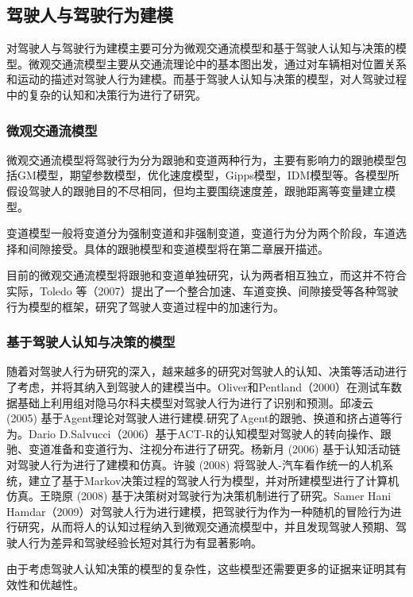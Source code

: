 \subsection{驾驶人与驾驶行为建模}
对驾驶人与驾驶行为建模主要可分为微观交通流模型和基于驾驶人认知与决策的模型。微观交通流模型主要从交通流理论中的基本图出发，通过对车辆相对位置关系和运动的描述对驾驶人行为建模。而基于驾驶人认知与决策的模型，对人驾驶过程中的复杂的认知和决策行为进行了研究。
\subsubsection{微观交通流模型}
微观交通流模型将驾驶行为分为跟驰和变道两种行为，主要有影响力的跟驰模型包括GM模型，期望参数模型，优化速度模型，Gipps模型，IDM模型等。各模型所假设驾驶人的跟驰目的不尽相同，但均主要围绕速度差，跟驰距离等变量建立模型。

变道模型一般将变道分为强制变道和非强制变道，变道行为分为两个阶段，车道选择和间隙接受。具体的跟驰模型和变道模型将在第二章展开描述。

目前的微观交通流模型将跟驰和变道单独研究，认为两者相互独立，而这并不符合实际，Toledo 等（2007）提出了一个整合加速、车道变换、间隙接受等各种驾驶行为模型的框架，研究了驾驶人变道过程中的加速行为\cite{Toledo2007}。


\subsubsection{基于驾驶人认知与决策的模型}
随着对驾驶人行为研究的深入，越来越多的研究对驾驶人的认知、决策等活动进行了考虑，并将其纳入到驾驶人的建模当中。Oliver和Pentland（2000）在测试车数据基础上利用组对隐马尔科夫模型对驾驶人行为进行了识别和预测\cite{Oliver2000}。邱凌云 (2005) 基于Agent理论对驾驶人进行建模.研究了Agent的跟驰、换道和挤占道等行为\cite{邱凌云2005}。Dario D.Salvucci（2006）基于ACT-R的认知模型对驾驶人的转向操作、跟驰、变道准备和变道行为、注视分布进行了研究\cite{Salvucci2006}。杨新月 (2006) 基于认知活动链对驾驶人行为进行了建模和仿真\cite{杨新月2006}。许骏 (2008) 将驾驶人-汽车看作统一的人机系统，建立了基于Markov决策过程的驾驶人行为模型，并对所建模型进行了计算机仿真\cite{许骏2008}。王晓原 (2008) 基于决策树对驾驶行为决策机制进行了研究\cite{王晓原2008}。Samer Hani Hamdar（2009）对驾驶人行为进行建模，把驾驶行为作为一种随机的冒险行为进行研究，从而将人的认知过程纳入到微观交通流模型中，并且发现驾驶人预期、驾驶人行为差异和驾驶经验长短对其行为有显著影响\cite{Hamdar2009a}。

由于考虑驾驶人认知决策的模型的复杂性，这些模型还需要更多的证据来证明其有效性和优越性。


